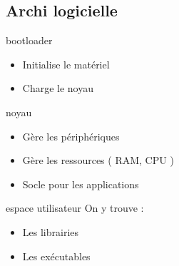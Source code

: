 \subsection{Archi logicielle}

\begin{frame}

	\begin{block}{bootloader}
		\begin{itemize}
			\item Initialise le matériel
			\item Charge le noyau
		\end{itemize}
	\end{block}

	\begin{block}{noyau}
		\begin{itemize}
			\item Gère les périphériques
			\item Gère les ressources ( RAM, CPU )
			\item Socle pour les applications
		\end{itemize}
	\end{block}

	\begin{block}{espace utilisateur}
		On y trouve :
		\begin{itemize}
			\item Les librairies
			\item Les exécutables
		\end{itemize}
	\end{block}

\end{frame}

